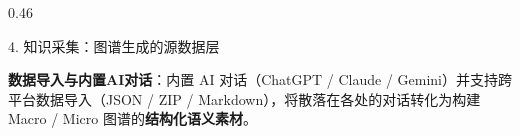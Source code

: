 \documentclass[final]{beamer}
\begin{document}
\begin{frame}[t]
\begin{columns}[t]
\begin{column}{0.46\paperwidth}
\begin{block}{4. 知识采集：图谱生成的源数据层}
\raggedright
\textbf{数据导入与内置AI对话}：内置 AI 对话（ChatGPT / Claude / Gemini）并支持跨平台数据导入（JSON / ZIP / Markdown），将散落在各处的对话转化为构建 Macro / Micro 图谱的\textbf{结构化语义素材}。\\[0.2cm]


\end{block}
\end{column}
\end{columns}
\end{frame}
\end{document}
